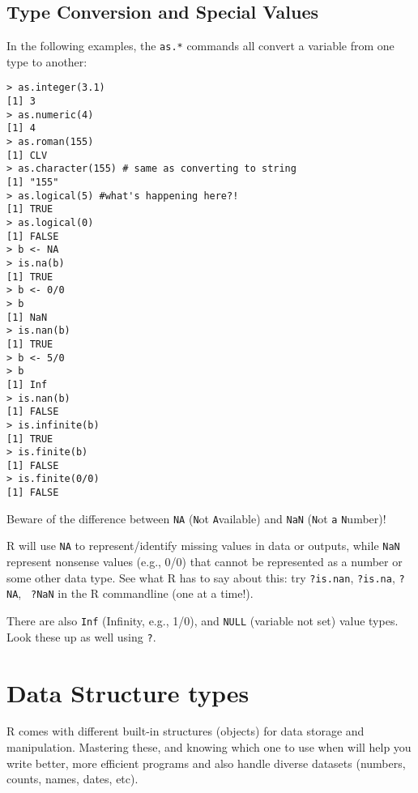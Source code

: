 \subsection{Type Conversion and Special Values}
In the following examples, the {\tt as.*} commands all convert a 
variable from one type to another:	
\begin{lstlisting}
> as.integer(3.1)
[1] 3
> as.numeric(4)
[1] 4
> as.roman(155)
[1] CLV
> as.character(155) # same as converting to string
[1] "155"
> as.logical(5) #what's happening here?!
[1] TRUE
> as.logical(0)
[1] FALSE
> b <- NA
> is.na(b)
[1] TRUE
> b <- 0/0
> b
[1] NaN
> is.nan(b)
[1] TRUE
> b <- 5/0
> b
[1] Inf
> is.nan(b)
[1] FALSE
> is.infinite(b)
[1] TRUE
> is.finite(b)
[1] FALSE
> is.finite(0/0)
[1] FALSE
\end{lstlisting}

\begin{tipbox}	
Beware of the difference between {\tt NA} ({\tt N}ot {\tt A}vailable) 
and {\tt NaN} ({\tt N}ot {\tt a} {\tt N}umber)!

R will use {\tt NA} to represent/identify missing values in data or 
outputs, while  {\tt NaN} represent nonsense values (e.g., 0/0) that 
cannot be represented as a number or some other data type. See what R 
has to say about this: try {\tt ?is.nan}, {\tt ?is.na}, {\tt ?NA}, {\tt 
?NaN} in the R commandline (one at a time!).

There are also {\tt Inf} (Infinity, e.g., 1/0), and {\tt NULL} 
(variable not set) value types. Look these up as well using {\tt ?}.
\end{tipbox}

\section{Data Structure types}
R comes with different built-in structures (objects) for data storage and 
manipulation. Mastering these, and knowing which one to use when will 
help you write better, more efficient programs and also handle diverse 
datasets (numbers, counts, names, dates, etc). 


